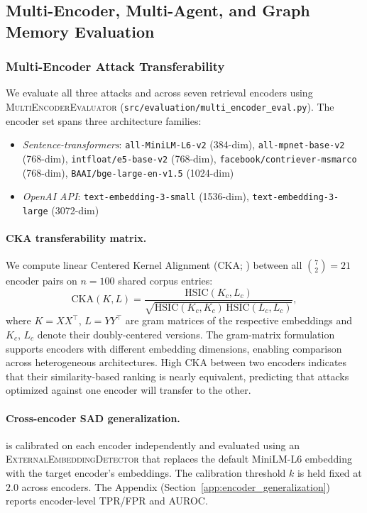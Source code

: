 \subsection{Multi-Encoder, Multi-Agent, and Graph Memory Evaluation}
\label{sec:phase22_results}

\subsubsection{Multi-Encoder Attack Transferability}

We evaluate all three attacks and \sad{} across seven retrieval encoders
using \textsc{MultiEncoderEvaluator} (\texttt{src/evaluation/multi\_encoder\_eval.py}).
The encoder set spans three architecture families:
\begin{itemize}
  \item \emph{Sentence-transformers}: \texttt{all-MiniLM-L6-v2} (384-dim),
        \texttt{all-mpnet-base-v2} (768-dim), \texttt{intfloat/e5-base-v2} (768-dim),
        \texttt{facebook/contriever-msmarco} (768-dim), \texttt{BAAI/bge-large-en-v1.5} (1024-dim)
  \item \emph{OpenAI API}: \texttt{text-embedding-3-small} (1536-dim),
        \texttt{text-embedding-3-large} (3072-dim)
\end{itemize}

\paragraph{CKA transferability matrix.}
We compute linear Centered Kernel Alignment (CKA; \citealt{kornblith2019similarity})
between all $\binom{7}{2} = 21$ encoder pairs on $n=100$ shared corpus entries:
\begin{equation}
  \mathrm{CKA}(K, L) =
  \frac{\mathrm{HSIC}(K_c, L_c)}{\sqrt{\mathrm{HSIC}(K_c, K_c)\,\mathrm{HSIC}(L_c, L_c)}},
  \label{eq:cka}
\end{equation}
where $K = XX^\top$, $L = YY^\top$ are gram matrices of the respective embeddings
and $K_c$, $L_c$ denote their doubly-centered versions.
The gram-matrix formulation supports encoders with different embedding dimensions,
enabling comparison across heterogeneous architectures.
High CKA between two encoders indicates that their similarity-based ranking is
nearly equivalent, predicting that attacks optimized against one encoder
will transfer to the other.

\paragraph{Cross-encoder SAD generalization.}
\sad{} is calibrated on each encoder independently and evaluated using an
\textsc{ExternalEmbeddingDetector} that replaces the default MiniLM-L6
embedding with the target encoder's embeddings.  The calibration threshold
$k$ is held fixed at $2.0$ across encoders.  The Appendix
(Section~\ref{app:encoder_generalization}) reports encoder-level TPR/FPR
and AUROC.

